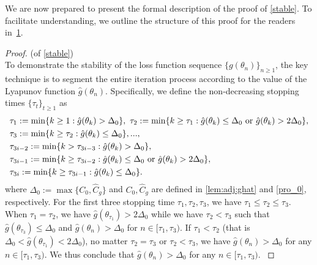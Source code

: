 \documentclass[standalone]{article}
\begin{document}
We are now prepared to present the formal description of the proof of \cref{stable}. To facilitate understanding, we outline the structure of this proof for the readers in~\cref{fig:proof:stability}.
\begin{figure}[omitted: a diagram of this paper's results, not reproduced here]\label{fig:proof:stability}\end{figure}
\begin{proof}(of \cref{stable}) \\
 To demonstrate the stability of the loss function sequence \(\{g(\theta_{n})\}_{n\ge 1}\), the key technique is to segment the entire iteration process according to the value of the Lyapunov function \(\hat{g}(\theta_{n})\). Specifically, we define the non-decreasing stopping times $\{\tau_{t}\}_{t\ge 1}$ as 
\begin{align}\label{stopping_time}
&\tau_{1}:=\min\{k\ge 1:\hat{g}(\theta_{k})>\Delta_0\},\ \tau_{2}:=\min\{k\ge \tau_{1}: \hat{g}(\theta_{k})\le  \Delta_0\ \text{or}\ \hat{g}(\theta_{k})>2\Delta_0\},\notag\\&\tau_{3}:=\min\{k\ge \tau_{2}:\hat{g}(\theta_{k})\le \Delta_0\},...,
\notag\\&\tau_{3i-2}:=\min\{k> \tau_{3i-3}:\hat{g}(\theta_{k})>\Delta_0\},\ \notag \\
&\tau_{3i-1}:=\min\{k\ge \tau_{3i-2}:\hat{g}(\theta_{k})\le  \Delta_0\ \text{or}\ \hat{g}(\theta_{k})>2\Delta_0\},\notag\\&\tau_{3i}:=\min\{k\ge  \tau_{3i-1}:\hat{g}(\theta_{k})\le  \Delta_0\}.
\end{align}
where $\Delta_0:=\max\{C_{0},\hat{C}_{g}\}$ and $C_0, \hat{C}_g$
are defined in \cref{lem:adj:ghat} and \cref{pro_0}, respectively.  
{For the first three stopping time $\tau_1, \tau_2, 
\tau_3$, we have $\tau_1 \leq \tau_2 \leq \tau_3$. When $\tau_1 = \tau_2$, we have $\hat{g}(\theta_{\tau_1}) > 2 \Delta_0$ while we have $\tau_2 < \tau_3$ such that $\hat{g}(\theta_{\tau_3}) \leq \Delta_0$ and $\hat{g}(\theta_n) > \Delta_0$ for $n \in [\tau_1, \tau_3)$. If $\tau_1 < \tau_2$ (that is $\Delta_0 < \hat{g}(\theta_{\tau_1}) < 2\Delta_0$), no matter $\tau_2 = \tau_3$ or $\tau_2 < \tau_3$, we have $\hat{g}(\theta_n) > \Delta_0$ for any $n \in [\tau_1, \tau_3)$. We thus conclude that $\hat{g}(\theta_n) > \Delta_0$ for any $n \in [\tau_{1}, \tau_3)$. }



\end{proof}
\end{document}
